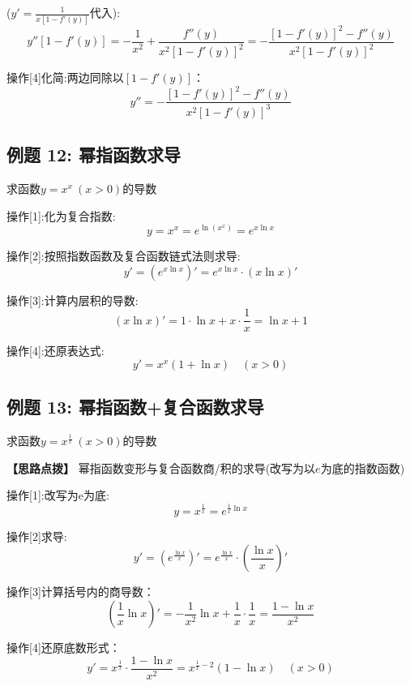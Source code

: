 \documentclass[11pt,a4paper,UTF8]{ctexart}
\begin{document}
			($y' = \frac{1}{x[1 - f'(y)]}$代入):
\begin{equation*}
y''[1 - f'(y)] = -\frac{1}{x^2} + \frac{f''(y)}{x^2[1 - f'(y)]^2} = -\frac{[1 - f'(y)]^2 - f''(y)}{x^2[1 - f'(y)]^2}
\end{equation*}


操作[4]化简:两边同除以$[1 - f'(y)]$：
\begin{equation*}
y'' = -\frac{[1 - f'(y)]^2 - f''(y)}{x^2[1 - f'(y)]^3}
\end{equation*}



\subsection{例题 12: 幂指函数求导}

求函数$y = x^x\ (x > 0)$的导数

操作[1]:化为复合指数:
\begin{equation*}
y = x^x = e^{\ln(x^x)} = e^{x\ln x}
\end{equation*}


操作[2]:按照指数函数及复合函数链式法则求导:
\begin{equation*}
y' = (e^{x\ln x})' = e^{x\ln x} \cdot (x\ln x)'
\end{equation*}


操作[3]:计算内层积的导数:
\begin{equation*}
(x\ln x)' = 1 \cdot \ln x + x \cdot \frac{1}{x} = \ln x + 1
\end{equation*}


操作[4]:还原表达式:
\begin{equation*}
y' = x^x(1 + \ln x) \quad (x > 0)
\end{equation*}



\subsection{例题 13: 幂指函数+复合函数求导}

求函数$y = x^{\frac{1}{x}}\ (x > 0)$的导数

\textbf{\color{DeepPurple}【思路点拨】} 幂指函数变形与复合函数商/积的求导(改写为以$e$为底的指数函数)


操作[1]:改写为e为底:
\begin{equation*}
y = x^{\frac{1}{x}} = e^{\frac{1}{x}\ln x}
\end{equation*}


操作[2]求导:
\begin{equation*}
y' = \left(e^{\frac{\ln x}{x}}\right)' = e^{\frac{\ln x}{x}} \cdot \left(\frac{\ln x}{x}\right)'
\end{equation*}


操作[3]计算括号内的商导数：
\begin{equation*}
\left(\frac{1}{x}\ln x\right)' = -\frac{1}{x^2}\ln x + \frac{1}{x} \cdot \frac{1}{x} = \frac{1 - \ln x}{x^2}
\end{equation*}


操作[4]还原底数形式：
\begin{equation*}
y' = x^{\frac{1}{x}} \cdot \frac{1 - \ln x}{x^2} = x^{\frac{1}{x} - 2}(1 - \ln x) \quad (x > 0)
\end{equation*}
\end{document}
